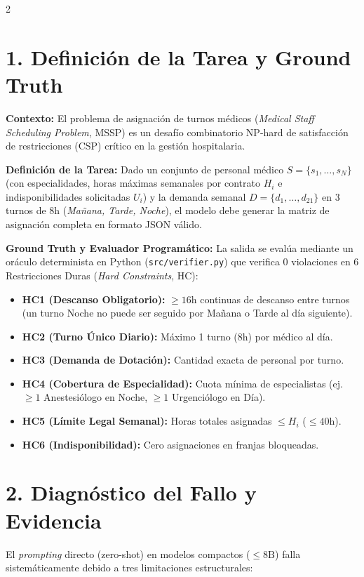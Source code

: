 \documentclass[9.5pt,a4paper]{extarticle}
\begin{document}
\begin{multicols}{2}

\section{1. Definición de la Tarea y Ground Truth}
\textbf{Contexto:} El problema de asignación de turnos médicos (\textit{Medical Staff Scheduling Problem}, MSSP) es un desafío combinatorio NP-hard de satisfacción de restricciones (CSP) crítico en la gestión hospitalaria.

\textbf{Definición de la Tarea:} Dado un conjunto de personal médico $S = \{s_1, \dots, s_N\}$ (con especialidades, horas máximas semanales por contrato $H_i$ e indisponibilidades solicitadas $U_i$) y la demanda semanal $D = \{d_1, \dots, d_{21}\}$ en 3 turnos de 8h (\textit{Mañana, Tarde, Noche}), el modelo debe generar la matriz de asignación completa en formato JSON válido.

\textbf{Ground Truth y Evaluador Programático:}
La salida se evalúa mediante un oráculo determinista en Python (\texttt{src/verifier.py}) que verifica 0 violaciones en 6 Restricciones Duras (\textit{Hard Constraints}, HC):
\begin{itemize}[label=$\blacktriangleright$]
    \item \textbf{HC1 (Descanso Obligatorio):} $\ge 16$h continuas de descanso entre turnos (un turno Noche no puede ser seguido por Mañana o Tarde al día siguiente).
    \item \textbf{HC2 (Turno Único Diario):} Máximo 1 turno (8h) por médico al día.
    \item \textbf{HC3 (Demanda de Dotación):} Cantidad exacta de personal por turno.
    \item \textbf{HC4 (Cobertura de Especialidad):} Cuota mínima de especialistas (ej. $\ge 1$ Anestesiólogo en Noche, $\ge 1$ Urgenciólogo en Día).
    \item \textbf{HC5 (Límite Legal Semanal):} Horas totales asignadas $\le H_i$ ($\le 40$h).
    \item \textbf{HC6 (Indisponibilidad):} Cero asignaciones en franjas bloqueadas.
\end{itemize}

\section{2. Diagnóstico del Fallo y Evidencia}
El \textit{prompting} directo (zero-shot) en modelos compactos ($\le 8\text{B}$) falla sistemáticamente debido a tres limitaciones estructurales:


\end{multicols}
\end{document}
